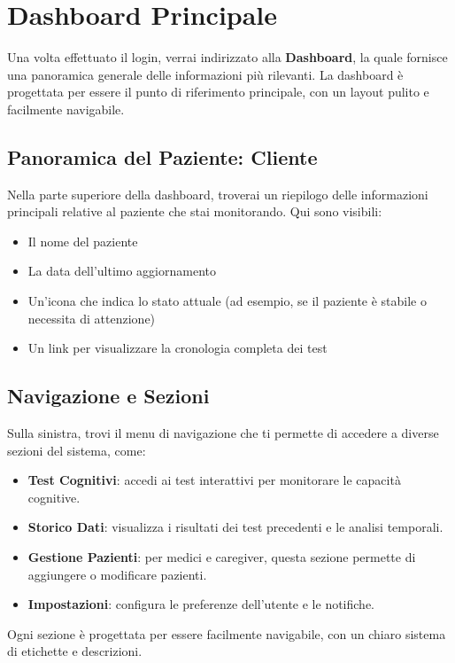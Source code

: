 \documentclass[a4paper,12pt]{book}
\begin{document}
	\section{Dashboard Principale}
	Una volta effettuato il login, verrai indirizzato alla \textbf{Dashboard}, la quale fornisce una panoramica generale delle informazioni più rilevanti. La dashboard è progettata per essere il punto di riferimento principale, con un layout pulito e facilmente navigabile.
	
	\subsection{Panoramica del Paziente: Cliente}
	Nella parte superiore della dashboard, troverai un riepilogo delle informazioni principali relative al paziente che stai monitorando. Qui sono visibili:
	\begin{itemize}
		\item Il nome del paziente
		\item La data dell'ultimo aggiornamento
		\item Un'icona che indica lo stato attuale (ad esempio, se il paziente è stabile o necessita di attenzione)
		\item Un link per visualizzare la cronologia completa dei test
	\end{itemize}
	
	\subsection{Navigazione e Sezioni}
	Sulla sinistra, trovi il menu di navigazione che ti permette di accedere a diverse sezioni del sistema, come:
	\begin{itemize}
		\item \textbf{Test Cognitivi}: accedi ai test interattivi per monitorare le capacità cognitive.
		\item \textbf{Storico Dati}: visualizza i risultati dei test precedenti e le analisi temporali.
		\item \textbf{Gestione Pazienti}: per medici e caregiver, questa sezione permette di aggiungere o modificare pazienti.
		\item \textbf{Impostazioni}: configura le preferenze dell'utente e le notifiche.
	\end{itemize}
	
	Ogni sezione è progettata per essere facilmente navigabile, con un chiaro sistema di etichette e descrizioni.
	
\end{document}

